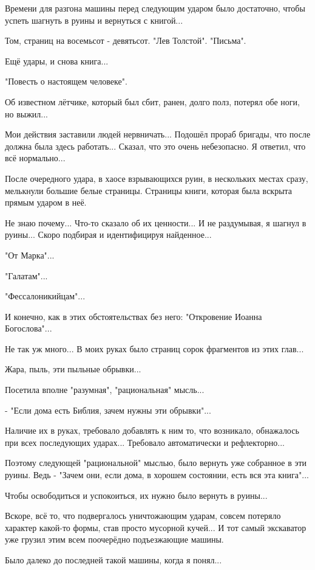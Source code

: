 Времени для разгона машины перед следующим ударом было достаточно, чтобы успеть
шагнуть в руины и вернуться с книгой...

Том, страниц на восемьсот - девятьсот. "Лев Толстой". "Письма".

Ещё удары, и снова книга... 

"Повесть о настоящем человеке". 

Об известном лётчике, который был сбит, ранен, долго полз, потерял обе ноги, но
выжил...

Мои действия заставили людей нервничать... Подошёл прораб бригады, что после
должна была здесь работать... Сказал, что это очень небезопасно. Я ответил, что
всё нормально...

После очередного удара, в хаосе взрывающихся руин, в нескольких местах сразу,
мелькнули большие белые страницы. Страницы книги, которая была вскрыта прямым
ударом в неё.

Не знаю почему... Что-то сказало об их ценности... И не раздумывая, я шагнул в
руины... Скоро подбирая и идентифицируя найденное...

"От Марка"...

"Галатам"...

"Фессалоникийцам"...

И конечно, как в этих обстоятельствах без него: "Откровение Иоанна
Богослова"...

Не так уж много... В моих руках было страниц сорок фрагментов из этих глав...

Жара, пыль, эти пыльные обрывки...

Посетила вполне "разумная", "рациональная" мысль...

- "Если дома есть Библия, зачем нужны эти обрывки"...

Наличие их в руках, требовало добавлять к ним то, что возникало, обнажалось при
всех последующих ударах... Требовало автоматически и рефлекторно... 

Поэтому следующей "рациональной" мыслью, было вернуть уже собранное в эти
руины. Ведь - "Зачем они, если дома, в хорошем состоянии, есть вся эта
книга"... 

Чтобы освободиться и успокоиться, их нужно было вернуть в руины...

Вскоре, всё то, что подвергалось уничтожающим ударам, совсем потеряло характер
какой-то формы, став просто мусорной кучей... И тот самый экскаватор уже грузил
этим всем поочерёдно подъезжающие машины.

Было далеко до последней такой машины, когда я понял...

